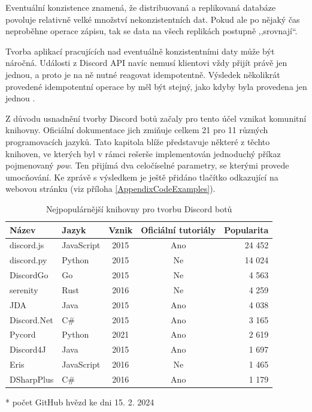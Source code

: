\documentclass[FM]{tulthesis}
\begin{document}
	Eventuální konzistence znamená, že distribuovaná a replikovaná databáze povoluje relativně velké množství nekonzistentních dat. Pokud ale po nějaký čas neproběhne operace zápisu, tak se data na všech replikách postupně ,,srovnají``. \cite{book_distributedSystems4}
	
	Tvorba aplikací pracujících nad eventuálně konzistentními daty může být náročná. Události z Discord API navíc nemusí klientovi vždy přijít právě jen jednou, a proto je na ně nutné reagovat idempotentně. Výsledek několikrát provedené idempotentní operace by měl být stejný, jako kdyby byla provedena jen jednou \cite{book_distributedSystemsUnderstanding}.
	
	Z důvodu usnadnění tvorby Discord botů začaly pro tento účel vznikat komunitní knihovny. Oficiální dokumentace jich zmiňuje celkem 21 pro 11 různých programovacích jazyků. Tato kapitola blíže představuje některé z těchto knihoven, ve kterých byl v rámci rešerše implementován jednoduchý příkaz pojmenovaný \textit{pow}. Ten přijímá dva celočíselné parametry, se kterými provede umocňování. Ke zprávě s výsledkem je ještě přidáno tlačítko odkazující na webovou stránku (viz příloha \ref{AppendixCodeExamples}).
	
	\begin{table}[ht]
		\centering
		\caption{Nejpopulárnější knihovny pro tvorbu Discord botů}\medskip
		\begin{threeparttable}
			\begin{tabular}{ l l c c r }
				\textbf{Název} & \textbf{Jazyk} & \textbf{Vznik} & \textbf{Oficiální tutoriály} & \textbf{Popularita}\tnote{*} \\\hline
				discord.js	& JavaScript & 2015 & Ano & 24 452 \\
				discord.py	& Python	 & 2015 & Ne  & 14 024 \\
				DiscordGo	& Go		 & 2015 & Ne  &  4 563 \\
				serenity	& Rust		 & 2016 & Ne  &  4 259 \\
				JDA			& Java		 & 2015 & Ano &  4 038 \\
				Discord.Net & C\#		 & 2015 & Ano &  3 165 \\
				Pycord		& Python	 & 2021 & Ano &  2 619 \\
				Discord4J	& Java		 & 2015 & Ano &  1 697 \\
				Eris		& JavaScript & 2016 & Ne  &  1 465 \\
				DSharpPlus	& C\#		 & 2016 & Ano &  1 179 \\
			\hline\end{tabular}
			\begin{tablenotes}
				\item[*] počet GitHub hvězd ke dni 15. 2. 2024
			\end{tablenotes}
		\end{threeparttable}
	\end{table}
	
\end{document}
